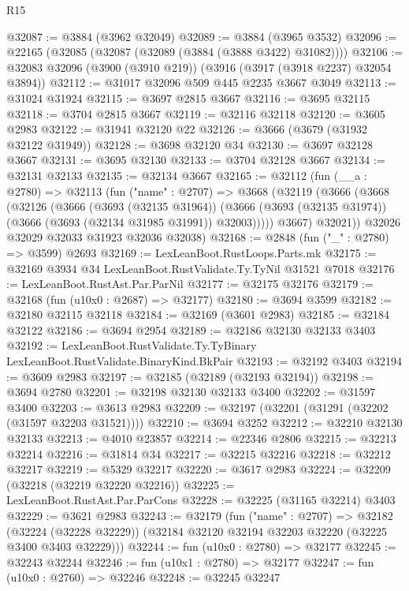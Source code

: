 \begin{lexlean}{R15}
\begin{coremodule}
@32087 := @3884 (@3962 @32049)
@32089 := @3884 (@3965 @3532)
@32096 := @22165 (@32085 (@32087 (@32089 (@3884 (@3888 @3422) @31082))))
@32106 := @32083 @32096 (@3900 (@3910 @219)) (@3916 (@3917 (@3918 @2237) @32054 @3894))
@32112 := @31017 @32096 @509 @445 @2235 @3667 @3049
@32113 := @31024 @31924
@32115 := @3697 @2815 @3667
@32116 := @3695 @32115
@32118 := @3704 @2815 @3667
@32119 := @32116 @32118
@32120 := @3605 @2983
@32122 := @31941 @32120 @22
@32126 := @3666 (@3679 (@31932 @32122 @31949))
@32128 := @3698 @32120 @34
@32130 := @3697 @32128 @3667
@32131 := @3695 @32130
@32133 := @3704 @32128 @3667
@32134 := @32131 @32133
@32135 := @32134 @3667
@32165 := @32112
    (fun (__a : @2780) =>
    @32113
      (fun ("name" : @2707) =>
      @3668
        (@32119
          (@3666
            (@3668
              (@32126
                (@3666
                  (@3693 (@32135 @31964))
                  (@3666 (@3693 (@32135 @31974)) (@3666 (@3693 (@32134 @31985 @31991)) @32003)))))
            @3667)
          @32021))
      @32026
      @32029
      @32033
      @31923
      @32036
      @32038)
@32168 := @2848 (fun ("_" : @2780) => @3599) @2693
@32169 := LexLeanBoot.RustLoops.Parts.mk
@32175 := @32169 @3934 @34 LexLeanBoot.RustValidate.Ty.TyNil @31521 @7018
@32176 := LexLeanBoot.RustAst.Par.ParNil
@32177 := @32175 @32176
@32179 := @32168 (fun (u10x0 : @2687) => @32177)
@32180 := @3694 @3599
@32182 := @32180 @32115 @32118
@32184 := @32169 (@3601 @2983)
@32185 := @32184 @32122
@32186 := @3694 @2954
@32189 := @32186 @32130 @32133 @3403
@32192 := LexLeanBoot.RustValidate.Ty.TyBinary LexLeanBoot.RustValidate.BinaryKind.BkPair
@32193 := @32192 @3403
@32194 := @3609 @2983
@32197 := @32185 (@32189 (@32193 @32194))
@32198 := @3694 @2780
@32201 := @32198 @32130 @32133 @3400
@32202 := @31597 @3400
@32203 := @3613 @2983
@32209 := @32197 (@32201 (@31291 (@32202 (@31597 @32203 @31521))))
@32210 := @3694 @3252
@32212 := @32210 @32130 @32133
@32213 := @4010 @23857
@32214 := @22346 @2806
@32215 := @32213 @32214
@32216 := @31814 @34
@32217 := @32215 @32216
@32218 := @32212 @32217
@32219 := @5329 @32217
@32220 := @3617 @2983
@32224 := @32209 (@32218 (@32219 @32220 @32216))
@32225 := LexLeanBoot.RustAst.Par.ParCons
@32228 := @32225 (@31165 @32214) @3403
@32229 := @3621 @2983
@32243 := @32179
    (fun ("name" : @2707) =>
    @32182
      (@32224 (@32228 @32229))
      (@32184 @32120 @32194 @32203 @32220 (@32225 @3400 @3403 @32229)))
@32244 := fun (u10x0 : @2780) => @32177
@32245 := @32243 @32244
@32246 := fun (u10x1 : @2780) => @32177
@32247 := fun (u10x0 : @2760) => @32246
@32248 := @32245 @32247

\end{coremodule}
\end{lexlean}
